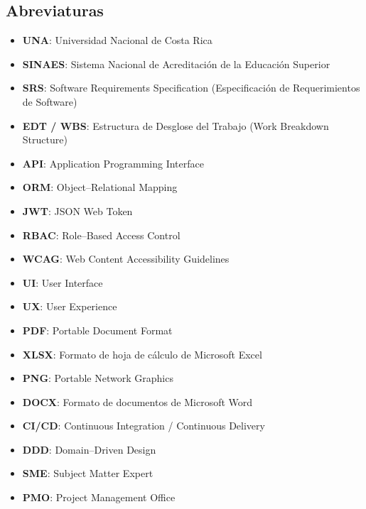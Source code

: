 \subsection*{Abreviaturas}
\begin{itemize}
    \item \textbf{UNA}: Universidad Nacional de Costa Rica
    \item \textbf{SINAES}: Sistema Nacional de Acreditación de la Educación Superior
    \item \textbf{SRS}: Software Requirements Specification (Especificación de Requerimientos de Software)
    \item \textbf{EDT / WBS}: Estructura de Desglose del Trabajo (Work Breakdown Structure)
    \item \textbf{API}: Application Programming Interface
    \item \textbf{ORM}: Object–Relational Mapping
    \item \textbf{JWT}: JSON Web Token
    \item \textbf{RBAC}: Role–Based Access Control
    \item \textbf{WCAG}: Web Content Accessibility Guidelines
    \item \textbf{UI}: User Interface
    \item \textbf{UX}: User Experience
    \item \textbf{PDF}: Portable Document Format
    \item \textbf{XLSX}: Formato de hoja de cálculo de Microsoft Excel
    \item \textbf{PNG}: Portable Network Graphics
    \item \textbf{DOCX}: Formato de documentos de Microsoft Word
    \item \textbf{CI/CD}: Continuous Integration / Continuous Delivery
    \item \textbf{DDD}: Domain–Driven Design
    \item \textbf{SME}: Subject Matter Expert
    \item \textbf{PMO}: Project Management Office
\end{itemize}
